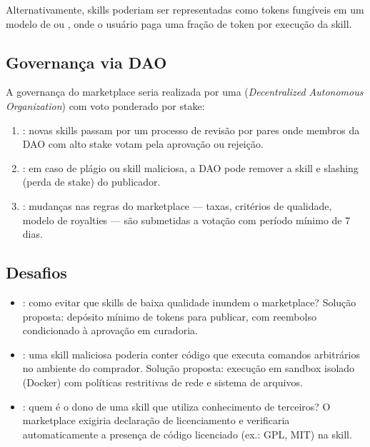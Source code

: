 Alternativamente, skills poderiam ser representadas como tokens
fungíveis em um modelo de  ou ,
onde o usuário paga uma fração de token por execução da skill.

\subsection{Governança via DAO}

A governança do marketplace seria realizada por uma 
(\textit{Decentralized Autonomous Organization}) com voto ponderado
por stake:

\begin{enumerate}
    \item {}: novas skills passam por
    um processo de revisão por pares onde membros da DAO com alto
    stake votam pela aprovação ou rejeição.

    \item {}: em caso de plágio ou
    skill maliciosa, a DAO pode remover a skill e slashing (perda
    de stake) do publicador.

    \item {}: mudanças nas regras do
    marketplace --- taxas, critérios de qualidade, modelo de
    royalties --- são submetidas a votação com período mínimo de
    7 dias.
\end{enumerate}

\subsection{Desafios}

\begin{itemize}
    \item {}: como evitar que skills de baixa
    qualidade inundem o marketplace? Solução proposta: depósito
    mínimo de tokens para publicar, com reembolso condicionado à
    aprovação em curadoria.

    \item {}: uma skill maliciosa poderia conter
    código que executa comandos arbitrários no ambiente do
    comprador. Solução proposta: execução em sandbox isolado
    (Docker) com políticas restritivas de rede e sistema de arquivos.

    \item {}: quem é o dono de uma skill
    que utiliza conhecimento de terceiros? O marketplace exigiria
    declaração de licenciamento e verificaria automaticamente a
    presença de código licenciado (ex.: GPL, MIT) na skill.
\end{itemize}

